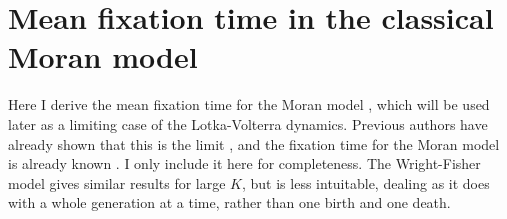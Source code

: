 \section{Mean fixation time in the classical Moran model}
Here I derive the mean fixation time for the Moran model \cite{Moran1962}, which will be used later as a limiting case of the Lotka-Volterra dynamics. 
Previous authors have already shown that this is the limit \cite{Lin2012,Constable2015,Chotibut2015}, and the fixation time for the Moran model is already known \cite{Moran1962}. I only include it here for completeness. 
The Wright-Fisher model gives similar results for large $K$, but is less intuitable, dealing as it does with a whole generation at a time, rather than one birth and one death. %


